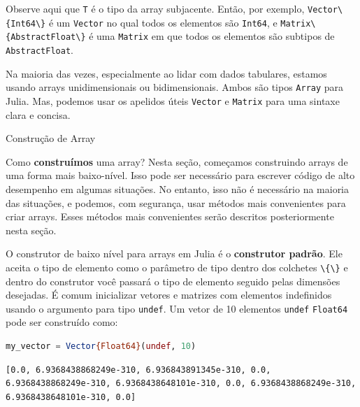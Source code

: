 \documentclass[
  notoc %
]{tufte-book}
\makeatletter
\newcommand{\passthrough}[1]{#1}
\renewcommand\subsubsection{%
\@startsection{subsubsection}{3}{\z@ }{-3.25ex\@plus -1ex \@minus -.2ex}{1.5ex \@plus .2ex}{\normalfont \normalsize \bfseries }
}
\makeatother
\begin{document}
Observe aqui que \passthrough{\lstinline!T!} é o tipo da array
subjacente. Então, por exemplo,
\passthrough{\lstinline!Vector\{Int64\}!} é um
\passthrough{\lstinline!Vector!} no qual todos os elementos são
\passthrough{\lstinline!Int64!}, e
\passthrough{\lstinline!Matrix\{AbstractFloat\}!} é uma
\passthrough{\lstinline!Matrix!} em que todos os elementos são subtipos
de \passthrough{\lstinline!AbstractFloat!}.

Na maioria das vezes, especialmente ao lidar com dados tabulares,
estamos usando arrays unidimensionais ou bidimensionais. Ambos são tipos
\passthrough{\lstinline!Array!} para Julia. Mas, podemos usar os
apelidos úteis \passthrough{\lstinline!Vector!} e
\passthrough{\lstinline!Matrix!} para uma sintaxe clara e concisa.

\hypertarget{sec:array_construction}{%
\subsubsection{Construção de Array}\label{sec:array_construction}}

Como \textbf{construímos} uma array? Nesta seção, começamos construindo
arrays de uma forma mais baixo-nível. Isso pode ser necessário para
escrever código de alto desempenho em algumas situações. No entanto,
isso não é necessário na maioria das situações, e podemos, com
segurança, usar métodos mais convenientes para criar arrays. Esses
métodos mais convenientes serão descritos posteriormente nesta seção.

O construtor de baixo nível para arrays em Julia é o \textbf{construtor
padrão}. Ele aceita o tipo de elemento como o parâmetro de tipo dentro
dos colchetes \passthrough{\lstinline!\{\}!} e dentro do construtor você
passará o tipo de elemento seguido pelas dimensões desejadas. É comum
inicializar vetores e matrizes com elementos indefinidos usando o
argumento para tipo \passthrough{\lstinline!undef!}. Um vetor de 10
elementos \passthrough{\lstinline!undef!}
\passthrough{\lstinline!Float64!} pode ser construído como:

\begin{lstlisting}[language=Julia]
my_vector = Vector{Float64}(undef, 10)
\end{lstlisting}

\begin{lstlisting}[language=Output]
[0.0, 6.9368438868249e-310, 6.936843891345e-310, 0.0, 6.9368438868249e-310, 6.9368438648101e-310, 0.0, 6.9368438868249e-310, 6.9368438648101e-310, 0.0]
\end{lstlisting}
\end{document}
